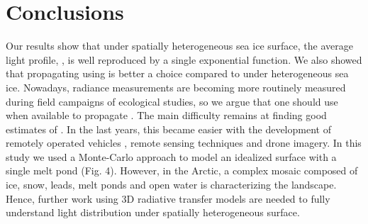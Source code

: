 \section{Conclusions}

Our results show that under spatially heterogeneous sea ice surface, the average light profile, \meanedz{}, is well reproduced by a single exponential function. We also showed that propagating \edzero{} using \klu{} is better a choice compared to \ked{} under heterogeneous sea ice. Nowadays, radiance measurements are becoming more routinely measured during field campaigns of ecological studies, so we argue that one should use \klu{} when available to propagate \edzero{}. The main difficulty remains at finding good estimates of \edzero{}. In the last years, this became easier with the development of remotely operated vehicles \citep{Katlein2015, Arndt2017, Nicolaus2013}, remote sensing techniques and drone imagery. In this study we used a Monte-Carlo approach to model an idealized surface with a single melt pond (Fig. 4). However, in the Arctic, a complex mosaic composed of ice, snow, leads, melt ponds and open water is characterizing the landscape. Hence, further work using 3D radiative transfer models are needed to fully understand light distribution under spatially heterogeneous surface.